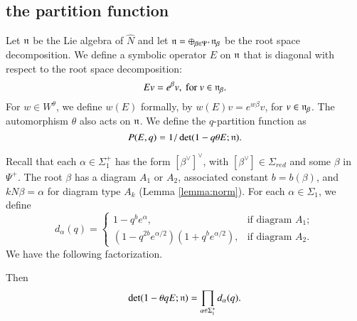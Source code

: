 \newpage


\subsection{the partition function}



Let ${\mathfrak n}$ be the Lie algebra of $\hat N$ and
let ${\mathfrak n} = \oplus_{\beta\in \Psi^+} {\mathfrak n}_\beta$ be the root space decomposition.  We define a symbolic operator $E$ on ${\mathfrak n}$ that is diagonal with
respect to the root space decomposition:
\[
E v = e^{\beta} v, \text{ for } v \in {\mathfrak n}_\beta.
\]
For $w\in W^\theta$, we define $w(E)$ formally, by $w(E) v = e^{ w \beta} v$, for $v\in {\mathfrak n}_\beta$.
The automorphism $\theta$ also acts on ${\mathfrak n}$.  We define the $q$-partition function as
\begin{equation}
P(E,q) = 1/\det(1- q \theta E;{\mathfrak n}).
\end{equation}

Recall that each $\alpha\in \Sigma^+_1$ has the form $[\beta^\vee]^\vee$, with $[\beta^\vee]\in \Sigma_{red}$
and some $\beta$  in $\Psi^+$.  The root $\beta$ has a diagram $A_1$ or $A_2$,
associated constant $b=b(\beta)$, and $k N\beta = \alpha$ for diagram type $A_k$ (Lemma \ref{lemma:norm}).
For each $\alpha\in \Sigma_1$, we define
\begin{equation}\label{eqn:d}
d_\alpha(q) =
\begin{cases} {1-q^b e^\alpha},    &\text{if diagram } A_1;\\
{(1-q^{2b} e^{\alpha/2})(1+q^b e^{\alpha/2})},
&\text{if diagram } A_2.
\end{cases}
\end{equation}
We have the following factorization.

\begin{lemma} \label{lemma:prod}
Then
\[
\det(1-\theta  q E;{\mathfrak n}) = \prod_{\alpha\in\Sigma^+_1} d_\alpha(q).
\]
\end{lemma}

